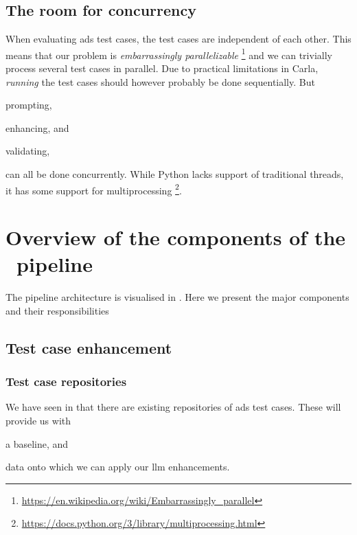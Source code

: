 \subsection{The room for concurrency}

When evaluating \acrshort{ads} test cases, the test cases are independent of each
other. This means that our problem is \textit{embarrassingly parallelizable}
\footnote{\url{https://en.wikipedia.org/wiki/Embarrassingly_parallel}} and we can
trivially process several test cases in parallel. Due to practical limitations
in Carla, \textit{running} the test cases should however probably be done
sequentially. But \begin{inparaenum}
    \item prompting,
    \item enhancing, and
    \item validating,
\end{inparaenum}
can all be done concurrently. While Python lacks support of traditional threads,
it has some support for multiprocessing
\footnote{\url{https://docs.python.org/3/library/multiprocessing.html}}.

\section{Overview of the components of the \hefe~pipeline}

The pipeline architecture is visualised in . Here we
present the major components and their responsibilities


\subsection{Test case enhancement}

\subsubsection{Test case repositories}

We have seen in  that there are existing repositories of
\acrshort{ads} test cases. These will provide us with \begin{inparaenum}
    \item a baseline,
    and
    \item data onto which we can apply our \acrshort{llm} enhancements.
\end{inparaenum}

